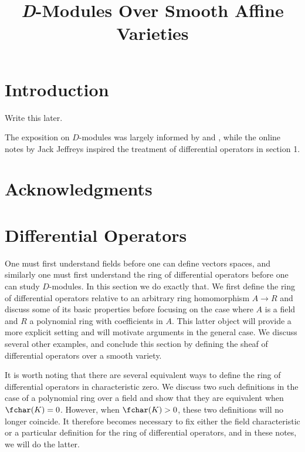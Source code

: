 
\usepackage{indentfirst}

\title{\textit{D}-Modules Over Smooth Affine Varieties}
\date{}

\usepackage{titling}
\renewcommand\maketitlehooka{\null\mbox{}\vfill}
\renewcommand\maketitlehookd{\vfill\null}

\maketitle

\newpage

\tableofcontents
\newpage
\section*{Introduction}
Write this later.

The exposition on $D$-modules was largely informed by \cite{d-mod-primer} and \cite{d-mod_ps-rt}, while the online notes \cite{jeffries_d-mod} by Jack Jeffreys inspired the treatment of differential operators in section 1. 

\section*{Acknowledgments}
\newpage
\section{Differential Operators}
One must first understand fields before one can define vectors spaces, and similarly one must first understand the ring of differential operators before one can study $D$-modules. In this section we do exactly that. We first define the ring of differential operators relative to an arbitrary ring homomorphism $A\to R$ and discuss some of its basic properties before focusing on the case where $A$ is a field and $R$ a polynomial ring with coefficients in $A$. This latter object will provide a more explicit setting and will motivate arguments in the general case. We discuss several other examples, and conclude this section by defining the sheaf of differential operators over a smooth variety.

It is worth noting that there are several equivalent ways to define the ring of differential operators in characteristic zero. We discuss two such definitions in the case of a polynomial ring over a field and show that they are equivalent when $\fchar(K) = 0$. However, when $\fchar(K) > 0$, these two definitions will no longer coincide. It therefore becomes necessary to fix either the field characteristic or a particular definition for the ring of differential operators, and in these notes, we will do the latter.

